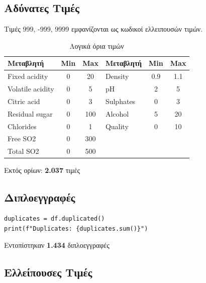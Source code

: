 \documentclass[12pt,a4paper]{article}
\begin{document}
\subsection{\textgreek{Αδύνατες Τιμές}}

\textgreek{Τιμές 999, -999, 9999 εμφανίζονται ως κωδικοί ελλειπουσών τιμών.}

\begin{table}[H]
\centering
\caption{\textgreek{Λογικά όρια τιμών}}
\begin{tabular}{lcc|lcc}
\toprule
\textbf{\textgreek{Μεταβλητή}} & \textbf{Min} & \textbf{Max} & \textbf{\textgreek{Μεταβλητή}} & \textbf{Min} & \textbf{Max} \\
\midrule
Fixed acidity & 0 & 20 & Density & 0.9 & 1.1 \\
Volatile acidity & 0 & 5 & pH & 2 & 5 \\
Citric acid & 0 & 3 & Sulphates & 0 & 3 \\
Residual sugar & 0 & 100 & Alcohol & 5 & 20 \\
Chlorides & 0 & 1 & Quality & 0 & 10 \\
Free SO2 & 0 & 300 & & & \\
Total SO2 & 0 & 500 & & & \\
\bottomrule
\end{tabular}
\end{table}

\textgreek{Εκτός ορίων:} \textbf{2.037} \textgreek{τιμές}

\subsection{\textgreek{Διπλοεγγραφές}}

\begin{lstlisting}
duplicates = df.duplicated()
print(f"Duplicates: {duplicates.sum()}")
\end{lstlisting}

\begin{mdframed}[style=okbox]
\textgreek{Εντοπίστηκαν} \textbf{1.434} \textgreek{διπλοεγγραφές}
\end{mdframed}

\subsection{\textgreek{Ελλείπουσες Τιμές}}
\end{document}
